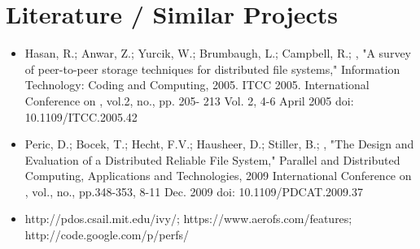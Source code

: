 \documentclass[a4paper, 11pt]{scrartcl}                %
\begin{document}
\section{Literature / Similar Projects}

\begin{itemize}
	\item Hasan, R.; Anwar, Z.; Yurcik, W.; Brumbaugh, L.; Campbell, R.; , "A survey of peer-to-peer storage techniques for distributed file systems," Information Technology: Coding and Computing, 2005. ITCC 2005. International Conference on , vol.2, no., pp. 205- 213 Vol. 2, 4-6 April 2005
doi: 10.1109/ITCC.2005.42
	\item Peric, D.; Bocek, T.; Hecht, F.V.; Hausheer, D.; Stiller, B.; , "The Design and Evaluation of a Distributed Reliable File System," Parallel and Distributed Computing, Applications and Technologies, 2009 International Conference on , vol., no., pp.348-353, 8-11 Dec. 2009
doi: 10.1109/PDCAT.2009.37
	\item http://pdos.csail.mit.edu/ivy/; https://www.aerofs.com/features; http://code.google.com/p/perfs/
	
\end{itemize}
\end{document}
